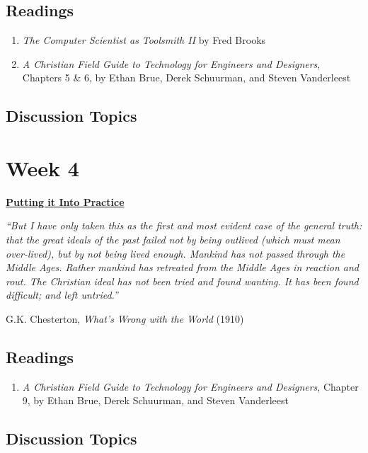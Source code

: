 \documentclass[11pt]{article}
\let\oldsection\section
\renewcommand\section{\clearpage\oldsection}
\begin{document}
\subsection*{Readings}
\label{sec:org1273aec}
\begin{enumerate}
\item \emph{The Computer Scientist as Toolsmith II} by Fred Brooks
\item \emph{A Christian Field Guide to Technology for Engineers and Designers}, Chapters
5 \& 6, by Ethan Brue, Derek Schuurman, and Steven Vanderleest
\end{enumerate}
\subsection*{Discussion Topics}
\label{sec:org8c61c08}
\section*{Week 4}
\label{sec:orgd915e4e}
\begin{center}
\large \textbf{\uline{Putting it Into Practice}}
\end{center}

\begin{mdframed}
\emph{``But I have only taken this as the first and most evident case of the general
truth: that the great ideals of the past failed not by being outlived (which
must mean over-lived), but by not being lived enough. Mankind has not passed
through the Middle Ages. Rather mankind has retreated from the Middle Ages in
reaction and rout. The Christian ideal has not been tried and found wanting. It
has been found difficult; and left untried.''}

\hfill G.K. Chesterton, \emph{What's Wrong with the World} (1910)
\end{mdframed}
\subsection*{Readings}
\label{sec:orge7ea464}
\begin{enumerate}
\item \emph{A Christian Field Guide to Technology for Engineers and Designers}, Chapter
9, by Ethan Brue, Derek Schuurman, and Steven Vanderleest
\end{enumerate}
\subsection*{Discussion Topics}
\label{sec:org1067322}
\end{document}
